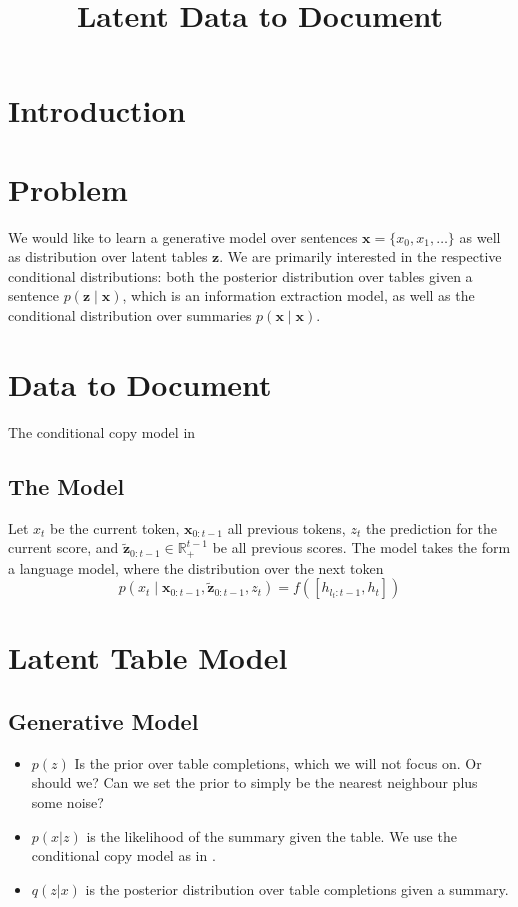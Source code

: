 \documentclass{article}
\title{Latent Data to Document}
\newcommand{\bx}{\mathbf{x}}
\newcommand{\bz}{\mathbf{z}}
\newcommand{\R}{\mathbb{R}}
\begin{document}
\maketitle

\section{Introduction}

\section{Problem}
We would like to learn a generative model
over sentences $\bx = \{x_0, x_1, \ldots\}$ as well as distribution over latent tables $\bz$.  
We are primarily interested in the respective conditional distributions:
both the posterior distribution over tables given a sentence $p(\bz\mid\bx)$,
which is an information extraction model,
as well as the conditional distribution over summaries $p(\bx\mid\bx)$.

\section{Data to Document}
The conditional copy model in \citet{wiseman2017d2t}

\subsection{The Model}
Let $x_t$ be the current token, $\bx_{0:t-1}$ all previous tokens,
$z_t$ the prediction for the current score,
and $\tilde{\bz}_{0:t-1}\in\R^{t-1}_+$ be all previous scores.
The model takes the form a language model, where
the distribution over the next token
$$p(x_t\mid \bx_{0:t-1}, \tilde{\bz}_{0:t-1},z_t) = f([h_{l_t:t-1},h_t])$$

\section{Latent Table Model}
\subsection{Generative Model}
\begin{itemize}
\item $p(z)$ Is the prior over table completions,
which we will not focus on.
Or should we?
Can we set the prior to simply be the nearest neighbour plus some noise?
\item $p(x|z)$ is the likelihood of the summary given the table.
We use the conditional copy model as in \citet{wiseman2017d2t}.
\item $q(z|x)$ is the posterior distribution over table completions given a summary.
\end{itemize}
\end{document}
